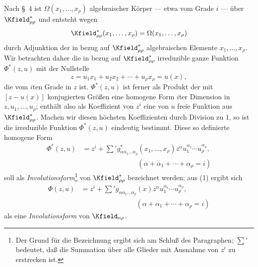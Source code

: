 \documentclass[11pt]{article}
\begin{document}
Nach \S\ 4 ist $\Omega(x_1,\ldots,x_\rho)$ algebraischer Körper --- etwa vom Grade $i$ --- über $\Kfield^*_{\rho\rho}$ und entsteht wegen
\[
  \Kfield^*_{\rho\rho}(x_1,
  \ldots,x_\rho)=\Omega(x_1,\ldots,x_\rho)
\]
durch Adjunktion der in bezug auf $\Kfield^*_{\rho\rho}$ algebraischen Elemente $x_1,
\ldots,x_\rho$. Wir betrachten daher die in bezug auf $\Kfield^*_{\rho\rho}$ irreduzible ganze Funktion $\Phi^*(z,u)$ mit der Nullstelle
\[
  z=u_1x_1+u_2x_2+\cdots+u_\rho x_\rho=u(x),
\]
die vom $i$ten Grade in $z$ ist. $\Phi^*(z,u)$ ist ferner als Produkt der mit $[z-u(x)]$ konjugierten Größen eine homogene Form $i$ter Dimension in $z,u_1,
\ldots,u_\rho$; enthält also als Koeffizient von $z^i$ eine von $u$ freie Funktion aus $\Kfield^*_{\rho\rho}$. Machen wir diesen höchsten Koeffizienten durch Division zu $1$, so ist die irreduzible Funktion $\Phi^*(z,u)$ eindeutig bestimmt. Diese so definierte homogene Form
\begin{equation}
\begin{aligned}
  \Phi^*(z,u)
  &=z^i+
    \sum{}' g^*_{\alpha\alpha_1\ldots\alpha_\rho}(x_1,
    \ldots,x_\rho)
    z^\alpha u_1^{\alpha_1}\cdots u_\rho^{\alpha_\rho},\\
  &\hspace{8em}(\alpha+\alpha_1+\cdots+\alpha_\rho=i)
\end{aligned}
\tag{1}
\end{equation}
soll als \emph{Involutionsform}\footnote{Der Grund für die Bezeichnung ergibt sich am Schluß des Paragraphen; $\sum'$ bedeutet, daß die Summation über alle Glieder mit Ausnahme von $z^i$ zu erstrecken ist.} von $\Kfield^*_{\rho\rho}$ bezeichnet werden; aus (1) ergibt sich
\begin{equation}
\begin{aligned}
  \Phi(z,u)
  &=z^i+
    \sum{}' g_{\alpha\alpha_1\ldots\alpha_\rho}(x)
    z^\alpha u_1^{\alpha_1}\cdots u_\rho^{\alpha_\rho},\\
  &\hspace{8em}(\alpha+\alpha_1+\cdots+\alpha_\rho=i)
\end{aligned}
\tag{2}
\end{equation}
als eine \emph{Involutionsform} von $\Kfield_{n\rho}$.
\end{document}
